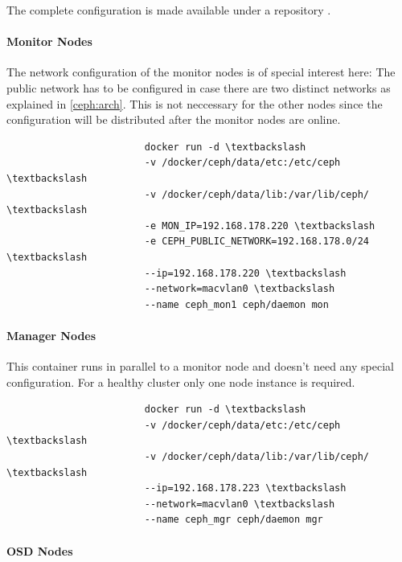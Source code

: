 \documentclass[titlepage, a4paper, 11pt]{scrartcl}
\begin{document}
                The complete configuration is made available under a repository \cite{ghceph}.

                \paragraph{Monitor Nodes}

                    The network configuration of the monitor nodes is of special interest here: The public network has to be configured in case there are two 
                    distinct networks as explained in \ref{ceph:arch}. This is not neccessary for the other nodes since the configuration will be distributed
                    after the monitor nodes are online.

                    \begin{lstlisting}
                        docker run -d \textbackslash
                        -v /docker/ceph/data/etc:/etc/ceph \textbackslash
                        -v /docker/ceph/data/lib:/var/lib/ceph/ \textbackslash
                        -e MON_IP=192.168.178.220 \textbackslash
                        -e CEPH_PUBLIC_NETWORK=192.168.178.0/24 \textbackslash
                        --ip=192.168.178.220 \textbackslash
                        --network=macvlan0 \textbackslash
                        --name ceph_mon1 ceph/daemon mon                        
                    \end{lstlisting}

                \paragraph{Manager Nodes}

                    This container runs in parallel to a monitor node and doesn't need any special configuration. For a healthy cluster only one node instance is required.

                    \begin{lstlisting}                    
                        docker run -d \textbackslash
                        -v /docker/ceph/data/etc:/etc/ceph \textbackslash
                        -v /docker/ceph/data/lib:/var/lib/ceph/ \textbackslash
                        --ip=192.168.178.223 \textbackslash
                        --network=macvlan0 \textbackslash
                        --name ceph_mgr ceph/daemon mgr
                    \end{lstlisting}

                \paragraph{OSD Nodes}
\end{document}
